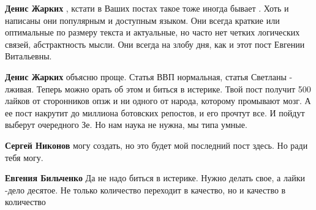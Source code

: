 \begin{itemize}
\begin{itemize}
 
\textbf{Денис Жарких} , кстати в Ваших постах такое тоже иногда бывает . \Smiley[1.0][yellow]Хоть
и написаны они популярным и доступным языком. Они всегда краткие или
оптимальные по размеру текста и актуальные, но часто нет четких логических
связей, абстрактность мысли. Они всегда на злобу дня, как и этот пост Евгении
Витальевны.

 
\textbf{Денис Жарких} объясню проще. Статья ВВП нормальная, статья Светланы -
лживая. Теперь можно орать об этом и биться в истерике. Твой пост получит 500
лайков от сторонников опзж и ни одного от народа, которому промывают мозг. А ее
пост накрутит до миллиона ботовских репостов, и его прочтут все. И пойдут
выберут очередного Зе. Но нам наука не нужна, мы типа умные.

 
\textbf{Сергей Никонов} могу создать, но это будет мой последний пост здесь. Но ради тебя могу.

 
\textbf{Евгения Бильченко} Да не надо биться в истерике. Нужно делать свое, а лайки -дело десятое. Не только количество переходит в качество, но и качество в количество

 

\end{itemize}
\end{itemize}
